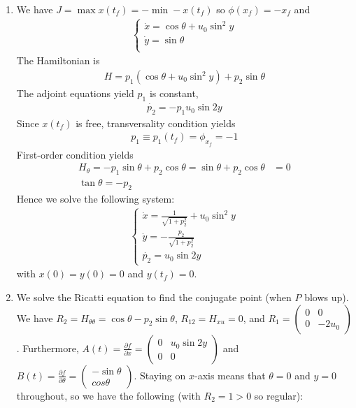 \documentclass[12pt]{article}
\begin{document}
\begin{problem}[5]
\begin{enumerate}[label=(\alph*)]
\item We have $ J = \max x(t_f) = - \min - x(t_f)$ so $ \phi(x_f)=-x_f$ and
\begin{align*}
	\begin{cases}
		\dot{x} = \cos \theta + u_0 \sin^2y\\
		\dot{y} = \sin \theta\\
	\end{cases}
\end{align*}
The Hamiltonian is
\begin{align*}
	H = p_1(\cos \theta + u_0 \sin^2 y) + p_2 \sin \theta
\end{align*}
The adjoint equations yield $ p_1$ is constant,
\begin{align*}
	 \dot{p_2} = -p_1 u_0 \sin 2y
\end{align*}
Since $ x(t_f)$ is free, transversality condition yields
 \begin{align*}
	p_1 \equiv p_1(t_f) = \phi_{x_f} = -1
\end{align*}
First-order condition yields
\begin{align*}
	H_{ \theta} = -p_1 \sin \theta + p_2 \cos \theta=\sin \theta+p_2 \cos \theta &= 0 \\
	\tan \theta = -p_2
\end{align*}
Hence we solve the following system:
\begin{align*}
	\begin{cases}
		\dot{x} = \frac{1}{ \sqrt{1+p_2^2} } + u_0 \sin^2 y\\
		\dot{y} = -\frac{p_2}{ \sqrt{1+p_2^2} }\\
		\dot{p_2} = u_0 \sin 2y
	\end{cases}
\end{align*}
with $ x(0) = y(0)=0$ and  $ y(t_f) = 0$.
\item We solve the Ricatti equation to find the conjugate point (when $ P$ blows up). We have  $ R_2 = H_{ \theta \theta} = \cos \theta - p_2 \sin \theta$, $ R_{12} = H_{xu} = 0$, and $ R_1 = \begin{pmatrix} 0&0\\0&-2u_0 \end{pmatrix} $. Furthermore, $ A(t) = \frac{\partial f}{\partial x} = \begin{pmatrix} 0&u_0 \sin 2y\\0&0 \end{pmatrix} $ and $ B(t) = \frac{\partial f}{\partial \theta} = \begin{pmatrix} -\sin \theta\\cos \theta \end{pmatrix} $. Staying on $ x$-axis means that  $ \theta =0$ and $ y=0$ throughout, so we have the following (with $ R_2 =1>0$ so regular):

\end{enumerate}
\end{problem}
\end{document}
